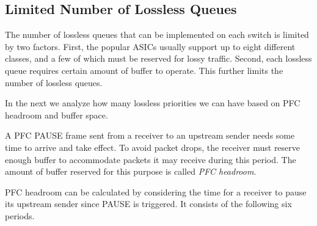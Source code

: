 \subsection{Limited Number of Lossless Queues}\label{subsec:pfcheadroom}

The number of lossless queues that can be implemented on each switch is limited by two factors. First, the popular ASICs usually support up to eight different classes,
and a few of which must be reserved for lossy traffic. Second, each lossless queue requires certain amount of buffer to operate. This further limits the number of
lossless queues.

In the next we analyze how many lossless priorities we can have based on PFC headroom and buffer space.

A PFC PAUSE frame sent from a receiver to an upstream sender needs some time to arrive and take effect. To avoid packet drops, the receiver must reserve enough buffer to accommodate packets it may receive during this period. The amount of buffer reserved for this purpose is called \textit{PFC headroom}.

PFC headroom can be calculated by considering the time for a receiver to pause its upstream sender since  PAUSE is triggered. It consists of the following six periods.

